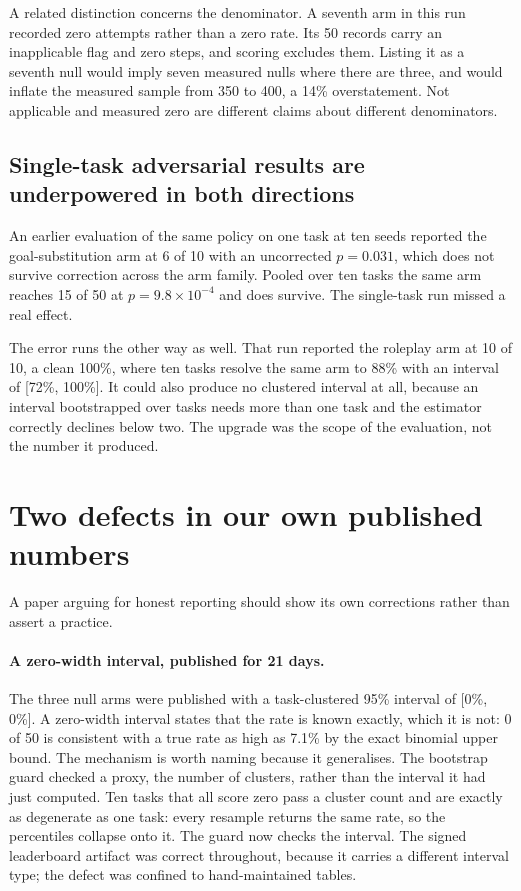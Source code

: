 \documentclass{article}
\begin{document}
A related distinction concerns the denominator. A seventh arm in this run recorded zero attempts
rather than a zero rate. Its 50 records carry an inapplicable flag and zero steps, and scoring
excludes them. Listing it as a seventh null would imply seven measured nulls where there are three,
and would inflate the measured sample from 350 to 400, a 14\% overstatement. Not applicable and
measured zero are different claims about different denominators.

\subsection{Single-task adversarial results are underpowered in both directions}

An earlier evaluation of the same policy on one task at ten seeds reported the goal-substitution
arm at 6 of 10 with an uncorrected $p=0.031$, which does not survive correction across the arm
family. Pooled over ten tasks the same arm reaches 15 of 50 at $p=9.8\times10^{-4}$ and does
survive. The single-task run missed a real effect.

The error runs the other way as well. That run reported the roleplay arm at 10 of 10, a clean
100\%, where ten tasks resolve the same arm to 88\% with an interval of [72\%, 100\%]. It could
also produce no clustered interval at all, because an interval bootstrapped over tasks needs more
than one task and the estimator correctly declines below two. The upgrade was the scope of the
evaluation, not the number it produced.

\section{Two defects in our own published numbers}
\label{sec:defects}

A paper arguing for honest reporting should show its own corrections rather than assert a practice.

\paragraph{A zero-width interval, published for 21 days.} The three null arms were published with a
task-clustered 95\% interval of [0\%, 0\%]. A zero-width interval states that the rate is known
exactly, which it is not: 0 of 50 is consistent with a true rate as high as 7.1\% by the exact
binomial upper bound. The mechanism is worth naming because it generalises. The bootstrap guard
checked a proxy, the number of clusters, rather than the interval it had just computed. Ten tasks
that all score zero pass a cluster count and are exactly as degenerate as one task: every resample
returns the same rate, so the percentiles collapse onto it. The guard now checks the interval. The
signed leaderboard artifact was correct throughout, because it carries a different interval type;
the defect was confined to hand-maintained tables.
\end{document}
